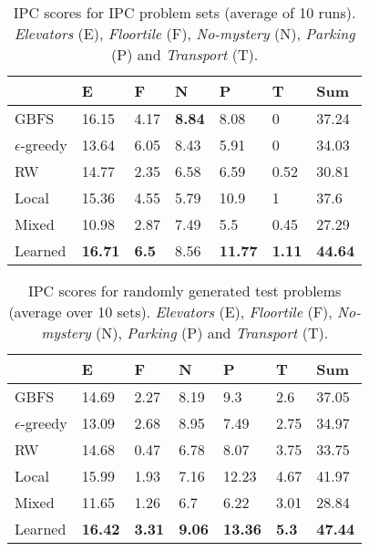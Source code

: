 \documentclass[letterpaper]{article} %
\begin{document}
\begin{table}
\begin{tabular}{|l|lllll|l|}
\hline
                  & E              & F            & N             & P              & T             & Sum            \\
\hline
GBFS              & 16.15          & 4.17         & \textbf{8.84} & 8.08           & 0             & 37.24          \\
$\epsilon$-greedy & 13.64          & 6.05         & 8.43          & 5.91           & 0             & 34.03          \\
RW                & 14.77          & 2.35         & 6.58          & 6.59           & 0.52          & 30.81          \\
Local             & 15.36          & 4.55         & 5.79          & 10.9           & 1             & 37.6           \\
Mixed             & 10.98          & 2.87         & 7.49          & 5.5            & 0.45          & 27.29          \\
Learned           & \textbf{16.71} & \textbf{6.5} & 8.56          & \textbf{11.77} & \textbf{1.11} & \textbf{44.64} \\
\hline
\end{tabular}
\label{tab:ipc-sets}
\caption{IPC scores for IPC problem sets (average of 10 runs). \emph{Elevators} (E), \emph{Floortile} (F), \emph{No-mystery} (N), \emph{Parking} (P) and \emph{Transport} (T).}
\end{table}

\begin{table}
\centering
\begin{tabular}{|l|lllll|l|}
\hline
                  & E              & F             & N             & P              & T            & Sum            \\
\hline
GBFS              & 14.69          & 2.27          & 8.19          & 9.3            & 2.6          & 37.05          \\
$\epsilon$-greedy & 13.09          & 2.68          & 8.95          & 7.49           & 2.75         & 34.97          \\
RW                & 14.68          & 0.47          & 6.78          & 8.07           & 3.75         & 33.75          \\
Local             & 15.99          & 1.93          & 7.16          & 12.23          & 4.67         & 41.97          \\
Mixed             & 11.65          & 1.26          & 6.7           & 6.22           & 3.01         & 28.84          \\
Learned           & \textbf{16.42} & \textbf{3.31} & \textbf{9.06} & \textbf{13.36} & \textbf{5.3} & \textbf{47.44} \\
\hline
\end{tabular}
\label{tab:test-sets}
\caption{IPC scores for randomly generated test problems (average over 10 sets). \emph{Elevators} (E), \emph{Floortile} (F), \emph{No-mystery} (N), \emph{Parking} (P) and \emph{Transport} (T).}
\end{table}
\end{document}
